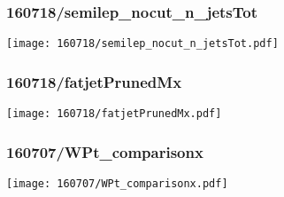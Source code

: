 \begin{frame}
   \frametitle{\small 160718/semilep\_nocut\_n\_jetsTot}
   \centering
   \texttt{[image: 160718/semilep\_nocut\_n\_jetsTot.pdf]}
\end{frame}

\begin{frame}
   \frametitle{\small 160718/fatjetPrunedMx}
   \centering
   \texttt{[image: 160718/fatjetPrunedMx.pdf]}
\end{frame}

\begin{frame}
   \frametitle{\small 160707/WPt\_comparisonx}
   \centering
   \texttt{[image: 160707/WPt\_comparisonx.pdf]}
\end{frame}

